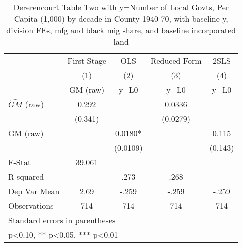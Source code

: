 \begin{table}[htbp]\centering
\def\sym#1{\ifmmode^{#1}\else\(^{#1}\)\fi}
\caption{Dererencourt Table Two with y=Number of Local Govts, Per Capita (1,000) by decade in County 1940-70, with baseline y, division FEs, mfg and black mig share, and baseline incorporated land}
\begin{tabular}{l*{4}{c}}
\toprule
                    & First Stage   &         OLS   &Reduced Form   &        2SLS   \\
                    &\multicolumn{1}{c}{(1)}&\multicolumn{1}{c}{(2)}&\multicolumn{1}{c}{(3)}&\multicolumn{1}{c}{(4)}\\
                    &\multicolumn{1}{c}{GM  (raw)}&\multicolumn{1}{c}{y\_L0}&\multicolumn{1}{c}{y\_L0}&\multicolumn{1}{c}{y\_L0}\\
\midrule
$\hat{GM}$ (raw)    &       0.292   &               &      0.0336   &               \\
                    &     (0.341)   &               &    (0.0279)   &               \\
\addlinespace
GM  (raw)           &               &      0.0180*  &               &       0.115   \\
                    &               &    (0.0109)   &               &     (0.143)   \\
\midrule
F-Stat              &      39.061   &               &               &               \\
R-squared           &               &        .273   &        .268   &               \\
Dep Var Mean        &        2.69   &       -.259   &       -.259   &       -.259   \\
Observations        &         714   &         714   &         714   &         714   \\
\bottomrule
\multicolumn{5}{l}{\footnotesize Standard errors in parentheses}\\
\multicolumn{5}{l}{\footnotesize * p<0.10, ** p<0.05, *** p<0.01}\\
\end{tabular}
\end{table}
